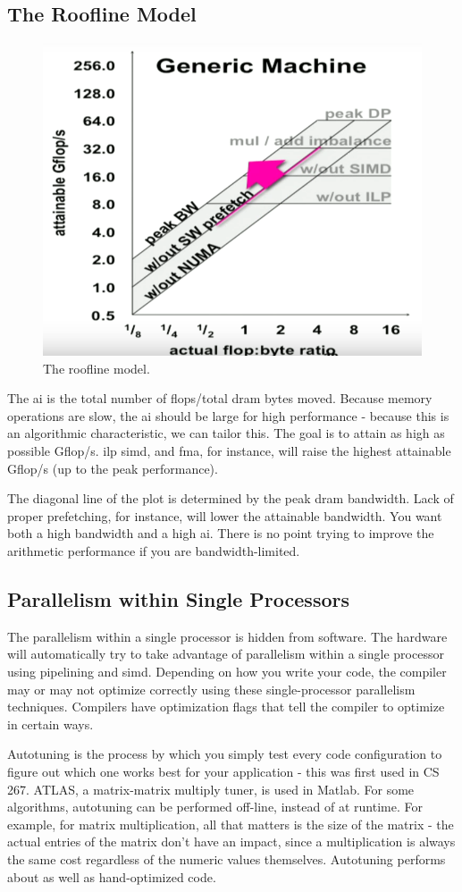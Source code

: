 \documentclass[10pt]{article}
\begin{document}
\begin{flushleft}
\subsection{The Roofline Model}

\begin{figure}[H]
\centering
\includegraphics[width=0.5\linewidth]{figures/roofline.pdf}
\caption{The roofline model.}
\end{figure}

The \gls{ai} is the total number of flops/total \gls{dram} bytes moved. Because memory operations are slow, the \gls{ai} should be large for high performance - because this is an algorithmic characteristic, we can tailor this. The goal is to attain as high as possible Gflop/s. \gls{ilp} \gls{simd}, and \gls{fma}, for instance, will raise the highest attainable Gflop/s (up to the peak performance). 

The diagonal line of the plot is determined by the peak \gls{dram} bandwidth. Lack of proper prefetching, for instance, will lower the attainable bandwidth. You want both a high bandwidth and a high \gls{ai}. There is no point trying to improve the arithmetic performance if you are bandwidth-limited.

\subsection{Parallelism within Single Processors}

The parallelism within a single processor is hidden from software. The hardware will automatically try to take advantage of parallelism within a single processor using pipelining and \gls{simd}. Depending on how you write your code, the compiler may or may not optimize correctly using these single-processor parallelism techniques. Compilers have optimization flags that tell the compiler to optimize in certain ways. 

Autotuning is the process by which you simply test every code configuration to figure out which one works best for your application - this was first used in CS 267. ATLAS, a matrix-matrix multiply tuner, is used in Matlab. For some algorithms, autotuning can be performed off-line, instead of at runtime. For example, for matrix multiplication, all that matters is the size of the matrix - the actual entries of the matrix don't have an impact, since a multiplication is always the same cost regardless of the numeric values themselves. Autotuning performs about as well as hand-optimized code.


\end{flushleft}
\end{document}
